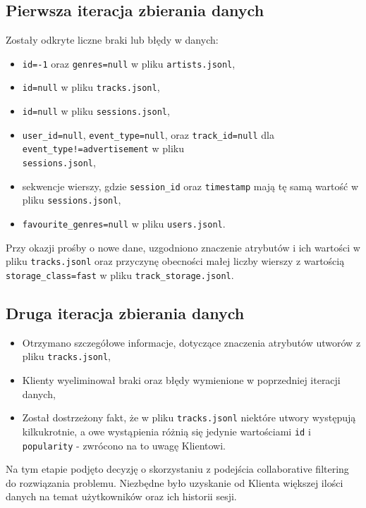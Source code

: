 \documentclass[10pt,a4paper]{article}
\begin{document}
\subsection{Pierwsza iteracja zbierania danych}
Zostały odkryte liczne braki lub błędy w danych:
\begin{itemize}
\item \texttt{id=-1} oraz \texttt{genres=null} w pliku \texttt{artists.jsonl},
\item \texttt{id=null} w pliku \texttt{tracks.jsonl},
\item \texttt{id=null} w pliku \texttt{sessions.jsonl},
\item \texttt{user\_id=null}, \texttt{event\_type=null}, oraz \texttt{track\_id=null} dla \texttt{event\_type!=advertisement} w pliku\\ \texttt{sessions.jsonl},
\item sekwencje wierszy, gdzie \texttt{session\_id} oraz \texttt{timestamp} mają tę samą wartość w pliku \texttt{sessions.jsonl},
\item \texttt{favourite\_genres=null} w pliku \texttt{users.jsonl}.

\end{itemize}

Przy okazji prośby o nowe dane, uzgodniono znaczenie atrybutów i ich wartości w pliku \texttt{tracks.jsonl} oraz przyczynę obecności małej liczby wierszy z wartością \texttt{storage\_class=fast} w pliku \texttt{track\_storage.jsonl}.

\subsection{Druga iteracja zbierania danych}
\begin{itemize}
\item Otrzymano szczegółowe informacje, dotyczące znaczenia atrybutów utworów z pliku \texttt{tracks.jsonl},
\item Klienty wyeliminował braki oraz błędy wymienione w poprzedniej iteracji danych,
\item Został dostrzeżony fakt, że w pliku \texttt{tracks.jsonl} niektóre utwory występują kilkukrotnie, a owe wystąpienia różnią się jedynie wartościami \texttt{id} i \texttt{popularity} - zwrócono na to uwagę Klientowi.

\end{itemize}

Na tym etapie podjęto decyzję o skorzystaniu z podejścia collaborative filtering do rozwiązania problemu. Niezbędne było uzyskanie od Klienta większej ilości danych na temat użytkowników oraz ich historii sesji.
\end{document}
